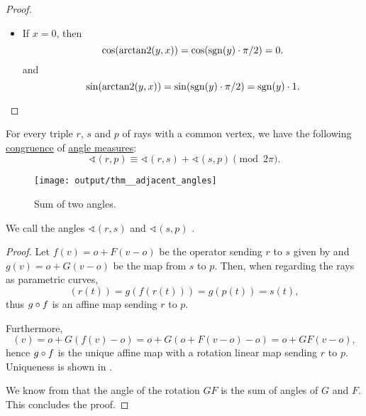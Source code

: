 \begin{proof}
\begin{itemize}
    \item If \( x = 0 \), then
    \begin{equation*}
      \cos(\arctantwo(y, x)) = \cos(\sgn(y) \cdot \ifrac \pi 2) = 0.
    \end{equation*}
    and
    \begin{equation*}
      \sin(\arctantwo(y, x)) = \sin(\sgn(y) \cdot \ifrac \pi 2) = \sgn(y) \cdot 1.
    \end{equation*}
  \end{itemize}
\end{proof}

\begin{proposition}\label{thm:adjacent_angles}
  For every triple \( r \), \( s \) and \( p \) of rays with a common vertex, we have the following \hyperref[rem:congruence_modulo_real_number]{congruence} of \hyperref[def:angle/measure]{angle measures}:
  \begin{equation*}
    \sphericalangle(r, p) \equiv \sphericalangle(r, s) + \sphericalangle(s, p) \pmod {2\pi}.
  \end{equation*}

  \begin{figure}[!ht]
    \centering
    \texttt{[image: output/thm\_\_adjacent\_angles]}
    \caption{Sum of two angles.}\label{fig:thm:adjacent_angles}
  \end{figure}

  We call the angles \( \sphericalangle(r, s) \) and \( \sphericalangle(s, p) \) .
\end{proposition}
\begin{proof}
  Let \( f(v) = o + F(v - o) \) be the operator sending \( r \) to \( s \) given by  and \( g(v) = o + G(v - o) \) be the map from \( s \) to \( p \). Then, when regarding the rays as parametric curves,
  \begin{equation*}
    [g \bincirc f](r(t)) = g(f(r(t))) = g(p(t)) = s(t),
  \end{equation*}
  thus \( g \bincirc f \) is an affine map sending \( r \) to \( p \).

  Furthermore,
  \begin{equation*}
    [g \bincirc f](v)
    =
    o + G(f(v) - o)
    =
    o + G(o + F(v - o) - o)
    =
    o + GF(v - o),
  \end{equation*}
  hence \( g \bincirc f \) is the unique affine map with a rotation linear map sending \( r \) to \( p \). Uniqueness is shown in .

  We know from  that the angle of the rotation \( GF \) is the sum of angles of \( G \) and \( F \). This concludes the proof.
\end{proof}

